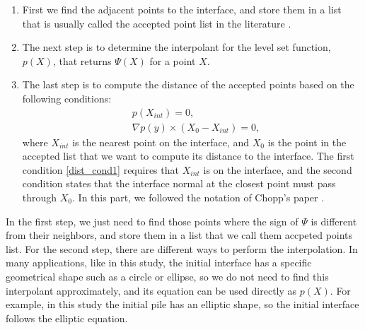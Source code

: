 \documentclass[letterpaper,10pt]{article}
\begin{document}
\begin{enumerate}
\item First we find the adjacent points to the interface, and store them in a list that is usually called the accepted point list in the literature \cite{Chopp2001}. 
\item The next step is to determine the interpolant for the level set function, $p(X)$, that returns $\varPsi(X)$ for a point $X$.
\item The last step is to compute the distance of the accepted points based on the following conditions:
\begin{subequations}
\begin{align}
&p(X_{int})=0,\label{dist_cond1} \\ 
&\nabla p(y) \times (X_0-X_{int})=0,\label{dist_cond2}
\end{align}
\end{subequations}
where $X_{int}$ is the nearest point on the interface, and $X_0$ is the point in the accepted list that we want to compute its distance to the interface. 
The first condition \eqref{dist_cond1} requires that $X_{int}$ is on the interface, and the second condition states that the interface normal at the closest point 
must pass through $X_0$. In this part, we followed the notation of Chopp's paper \citep{Chopp2001}.
\end{enumerate}

In the first step, we just need to find those points where the sign of $\varPsi$ is different from their neighbors, and store them in a list that we call them accpeted points list. 
For the second step, there are different ways to perform the interpolation. In many applications, like in this study, the initial interface has a specific geometrical shape such as a circle or ellipse, 
so we do not need to find this interpolant approximately, and its equation can be used directly as $p(X)$. 
For example, in this study the initial pile has an elliptic shape, so the initial interface follows the elliptic equation. 
\end{document}

